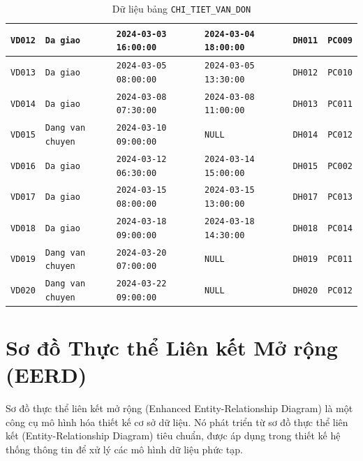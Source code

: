 \documentclass[11pt]{report}
\begin{document}
\begin{table}[H]
\begin{tabularx}{\textwidth}{|>{\small}l|>{\small}l|>{\small}l|>{\small}l|>{\small}l|>{\raggedright\arraybackslash\small}X|}
        \texttt{VD012} & \texttt{Da giao}         & \texttt{2024-03-03 16:00:00} & \texttt{2024-03-04 18:00:00} & \texttt{DH011} & \texttt{PC009} \\ \hline
        \texttt{VD013} & \texttt{Da giao}         & \texttt{2024-03-05 08:00:00} & \texttt{2024-03-05 13:30:00} & \texttt{DH012} & \texttt{PC010} \\ \hline
        \texttt{VD014} & \texttt{Da giao}         & \texttt{2024-03-08 07:30:00} & \texttt{2024-03-08 11:00:00} & \texttt{DH013} & \texttt{PC011} \\ \hline
        \texttt{VD015} & \texttt{Dang van chuyen} & \texttt{2024-03-10 09:00:00} & \texttt{NULL}                & \texttt{DH014} & \texttt{PC012} \\ \hline
        \texttt{VD016} & \texttt{Da giao}         & \texttt{2024-03-12 06:30:00} & \texttt{2024-03-14 15:00:00} & \texttt{DH015} & \texttt{PC002} \\ \hline
        \texttt{VD017} & \texttt{Da giao}         & \texttt{2024-03-15 08:00:00} & \texttt{2024-03-15 13:00:00} & \texttt{DH017} & \texttt{PC013} \\ \hline
        \texttt{VD018} & \texttt{Da giao}         & \texttt{2024-03-18 09:00:00} & \texttt{2024-03-18 14:30:00} & \texttt{DH018} & \texttt{PC014} \\ \hline
        \texttt{VD019} & \texttt{Dang van chuyen} & \texttt{2024-03-20 07:00:00} & \texttt{NULL}                & \texttt{DH019} & \texttt{PC011} \\ \hline
        \texttt{VD020} & \texttt{Dang van chuyen} & \texttt{2024-03-22 09:00:00} & \texttt{NULL}                & \texttt{DH020} & \texttt{PC012} \\ \hline
    \end{tabularx}
    \caption{Dữ liệu bảng \texttt{CHI\_TIET\_VAN\_DON}}
    \label{tab:data_vd}
\end{table}


\section{Sơ đồ Thực thể Liên kết Mở rộng (EERD)}
Sơ đồ thực thể liên kết mở rộng (Enhanced Entity-Relationship Diagram) là một công cụ mô hình hóa thiết kế cơ sở dữ liệu. Nó phát triển từ sơ đồ thực thể liên kết (Entity-Relationship Diagram) tiêu chuẩn, được áp dụng trong thiết kế hệ thống thông tin để xử lý các mô hình dữ liệu phức tạp.
\end{document}
